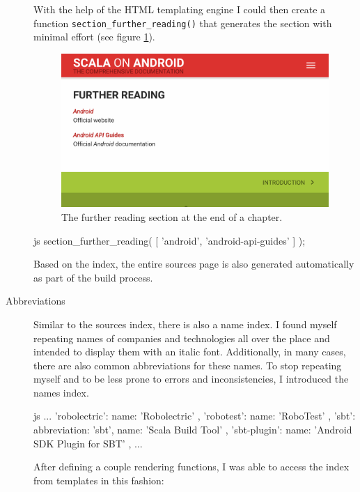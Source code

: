\begin{description}
	With the help of the \ac{HTML} templating engine I could then create a function \texttt{section\_further\_reading()} that generates the section with minimal effort (see figure \ref{further-reading}).

	\begin{figure}[H]
		\includegraphics[width=\textwidth]{asset/further-reading.png}
		\caption{The further reading section at the end of a chapter.}
		\label{further-reading}
	\end{figure}

	\begin{code}{js}
section_further_reading( [ 'android', 'android-api-guides' ] );
	\end{code}

	Based on the index, the entire sources page is also generated automatically as part of the build process.

	\item[Abbreviations]\hfill

	Similar to the sources index, there is also a name index. I found myself repeating names of companies and technologies all over the place and intended to display them with an italic font. Additionally, in many cases, there are also common abbreviations for these names. To stop repeating myself and to be less prone to errors and inconsistencies, I introduced the names index.

	\begin{code}{js}
...
'robolectric': { name: 'Robolectric' },
'robotest': { name: 'RoboTest' },
'sbt':
{
	abbreviation: 'sbt',
	name: 'Scala Build Tool'
},
'sbt-plugin': { name: 'Android SDK Plugin for SBT' },
...
	\end{code}

	After defining a couple rendering functions, I was able to access the index from templates in this fashion:


\end{description}
